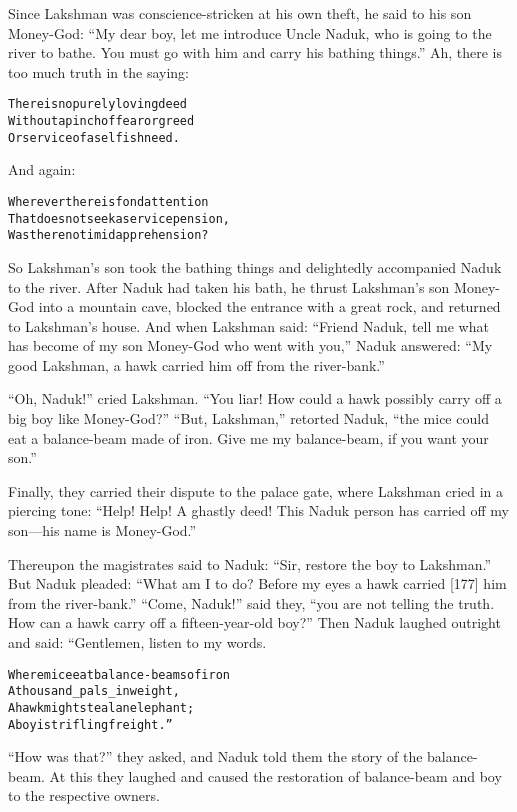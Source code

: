 \documentclass{article}
\renewenvironment{verbatim}{\begin{alltt}\normalfont\begin{centering}}{\end{centering}\end{alltt}}
\begin{document}
Since Lakshman was conscience-stricken at his own theft, he said to
his son Money-God:
``My dear boy, let me introduce Uncle Naduk, who is going to the river to bathe. You must go with him and carry his bathing things.''
Ah, there is too much truth in the saying:

\begin{verbatim}
There is no purely loving deed
Without a pinch of fear or greed
Or service of a selfish need.
\end{verbatim}
And again:

\begin{verbatim}
Wherever there is fond attention
That does not seek a service pension,
Was there no timid apprehension?
\end{verbatim}
So Lakshman's son took the bathing things and delightedly
accompanied Naduk to the river. After Naduk had taken his bath, he
thrust Lakshman's son Money-God into a mountain cave, blocked the
entrance with a great rock, and returned to Lakshman's house. And
when Lakshman said:
``Friend Naduk, tell me what has become of my son Money-God who went with you,''
Naduk answered:
``My good Lakshman, a hawk carried him off from the river-bank.''

``Oh, Naduk!'' cried Lakshman.
``You liar! How could a hawk possibly carry off a big boy like Money-God?''
``But, Lakshman,'' retorted Naduk,
``the mice could eat a balance-beam made of iron. Give me my balance-beam, if you want your son.''

Finally, they carried their dispute to the palace gate, where
Lakshman cried in a piercing tone:
``Help! Help! A ghastly deed! This Naduk person has carried off my son---his name is Money-God.''

Thereupon the magistrates said to Naduk:
``Sir, restore the boy to Lakshman.'' But Naduk pleaded:
``What am I to do? Before my eyes a hawk carried [177] him from the river-bank.''
``Come, Naduk!'' said they,
``you are not telling the truth. How can a hawk carry off a fifteen-year-old boy?''
Then Naduk laughed outright and said: “Gentlemen, listen to my
words.

\begin{verbatim}
Where mice eat balance-beams of iron
    A thousand _pals_ in weight,
A hawk might steal an elephant;
    A boy is trifling freight.”
\end{verbatim}
``How was that?'' they asked, and Naduk told them the story of the
balance-beam. At this they laughed and caused the restoration of
balance-beam and boy to the respective owners.
\end{document}
